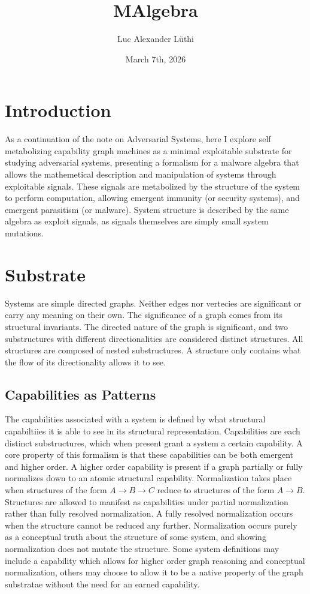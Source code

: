 \documentclass{article}
\title{MAlgebra}
\author{Luc Alexander L{\"u}thi}
\date{March 7th, 2026}
\begin{document}
	\maketitle
	\tableofcontents
	\section{Introduction}
	As a continuation of the note on Adversarial Systems, here I explore self metabolizing capability graph machines as a minimal exploitable substrate for studying adversarial systems, presenting a formalism for a malware algebra that allows the mathemetical description and manipulation of systems through exploitable signals. These signals are metabolized by the structure of the system to perform computation, allowing emergent immunity (or security systems), and emergent parasitism (or malware). System structure is described by the same algebra as exploit signals, as signals themselves are simply small system mutations. 
	\section{Substrate}
	Systems are simple directed graphs. Neither edges nor vertecies are significant or carry any meaning on their own. The significance of a graph comes from its structural invariants. The directed nature of the graph is significant, and two substructures with different directionalities are considered distinct structures. All structures are composed of nested substructures. A structure only contains what the flow of its directionality allows it to see.
	\subsection{Capabilities as Patterns}
	The capabilities associated with a system is defined by what structural capabiltiies it is able to see in its structural representation. Capabilities are each distinct substructures, which when present grant a system a certain capability. A core property of this formalism is that these capabilities can be both emergent and higher order. A higher order capability is present if a graph partially or fully normalizes down to an atomic structural capability. Normalization takes place when structures of the form $A \rightarrow B \rightarrow C$ reduce to structures of the form $A \rightarrow B$. Structures are allowed to manifest as capabilities under partial normalization rather than fully resolved normalization. A fully resolved normalization occurs when the structure cannot be reduced any further. Normalization occurs purely as a conceptual truth about the structure of some system, and showing normalization does not mutate the structure. Some system definitions may include a capability which allows for higher order graph reasoning and conceptual normalization, others may choose to allow it to be a native property of the graph substratae without the need for an earned capability. 
\end{document}
